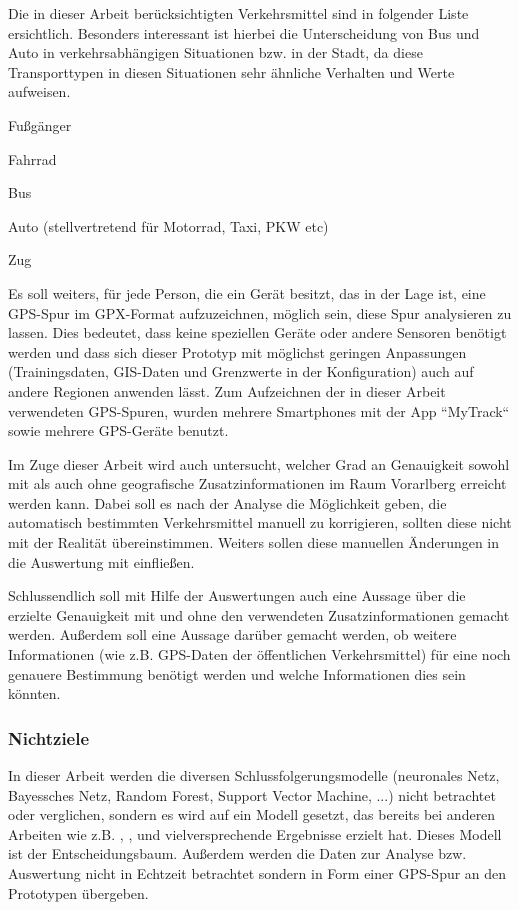 Die in dieser Arbeit berücksichtigten Verkehrsmittel sind in folgender Liste ersichtlich. Besonders interessant ist hierbei die Unterscheidung von Bus und Auto in verkehrsabhängigen Situationen bzw. in der Stadt, da diese Transporttypen in diesen Situationen sehr ähnliche Verhalten und Werte aufweisen. 

\begin{pitemize}
\item Fußgänger
\item Fahrrad
\item Bus
\item Auto (stellvertretend für Motorrad, Taxi, PKW etc)
\item Zug
\end{pitemize}

Es soll weiters, für jede Person, die ein Gerät besitzt, das in der Lage ist, eine GPS-Spur im GPX-Format aufzuzeichnen, möglich sein, diese Spur analysieren zu lassen. Dies bedeutet, dass keine speziellen Geräte oder andere Sensoren benötigt werden und dass sich dieser Prototyp mit möglichst geringen Anpassungen (Trainingsdaten, GIS-Daten und Grenzwerte in der Konfiguration) auch auf andere Regionen anwenden lässt. Zum Aufzeichnen der in dieser Arbeit verwendeten GPS-Spuren, wurden mehrere Smartphones mit der App ``MyTrack`` sowie mehrere GPS-Geräte benutzt.

Im Zuge dieser Arbeit wird auch untersucht, welcher Grad an Genauigkeit sowohl mit als auch ohne geografische Zusatzinformationen im Raum Vorarlberg erreicht werden kann. Dabei soll es nach der Analyse die Möglichkeit geben, die automatisch bestimmten Verkehrsmittel manuell zu korrigieren, sollten diese nicht mit der Realität übereinstimmen. Weiters sollen diese manuellen Änderungen in die Auswertung mit einfließen. 

Schlussendlich soll mit Hilfe der Auswertungen auch eine Aussage über die erzielte Genauigkeit mit und ohne den verwendeten Zusatzinformationen gemacht werden. Außerdem soll eine Aussage darüber gemacht werden, ob weitere Informationen (wie z.B. GPS-Daten der öffentlichen Verkehrsmittel) für eine noch genauere Bestimmung benötigt werden und welche Informationen dies sein könnten. 

\subsubsection{Nichtziele}

In dieser Arbeit werden die diversen Schlussfolgerungsmodelle (neuronales Netz, Bayessches Netz, Random Forest, Support Vector Machine, ...) nicht betrachtet oder verglichen, sondern es wird auf ein Modell gesetzt, das bereits bei anderen Arbeiten wie z.B. \cite{stenneth_transportation_2011}, \cite{reddy_using_2010}, \cite{sebastian_nagel_moglichkeitsstudie_2011} und  \cite{zheng_learning_2008} vielversprechende Ergebnisse erzielt hat. Dieses Modell ist der Entscheidungsbaum. Außerdem werden die Daten zur Analyse bzw. Auswertung nicht in Echtzeit betrachtet sondern in Form einer GPS-Spur an den Prototypen übergeben.

